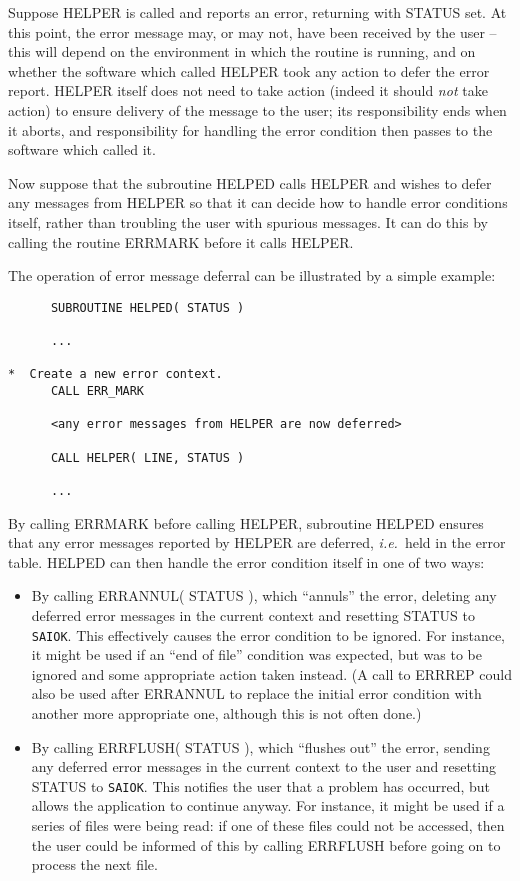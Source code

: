 \documentclass[twoside,11pt]{article}
\renewcommand{\_}{\texttt{\symbol{95}}}
\newcommand{\const}[1]{\texttt{#1}}
\newcommand{\saiok}{\const{SAI\_\_OK}}
\begin{document}
Suppose HELPER is called and reports an error, returning with STATUS set.
At this point, the error message may, or may not, have been received by the
user -- this will depend on the environment in which the routine is running,
and on whether the software which called HELPER took any action to defer the
error report.
HELPER itself does not need to take action (indeed it should \emph{not} take
action) to ensure delivery of the message to the user; its responsibility
ends when it aborts, and responsibility for handling the error condition then
passes to the software which called it.

Now suppose that the subroutine HELPED calls HELPER and wishes to defer any
messages from HELPER so that it can decide how to handle error conditions
itself, rather than troubling the user with spurious messages.
It can do this by calling the routine ERR\_MARK before it calls HELPER.

The operation of error message deferral can be illustrated by a simple
example:

\begin {small}
\begin{verbatim}
      SUBROUTINE HELPED( STATUS )

      ...

*  Create a new error context.
      CALL ERR_MARK

      <any error messages from HELPER are now deferred>

      CALL HELPER( LINE, STATUS )

      ...
\end{verbatim}
\end {small}

By calling ERR\_MARK before calling HELPER, subroutine HELPED ensures that any
error  messages reported by HELPER are deferred, \textit{i.e.}\ held in the error table.
HELPED can then handle the error condition itself in one of two ways:

\begin {itemize}
\item By calling ERR\_ANNUL( STATUS ), which ``annuls'' the error, deleting
any deferred error messages in the current context and resetting STATUS to
\saiok.
This effectively causes the error condition to be ignored.
For instance, it might be used if an ``end of file'' condition was expected,
but was to be ignored and some appropriate action taken instead.
(A call to ERR\_REP could also be used after ERR\_ANNUL to replace the
initial error condition with another more appropriate one, although this is
not often done.)

\item By calling ERR\_FLUSH( STATUS ), which ``flushes out'' the error,
sending any deferred error messages in the current context to the user and
resetting STATUS to \saiok.
This notifies the user that a problem has occurred, but allows the
application to continue anyway.
For instance, it might be used if a series of files were being read: if one
of these files could not be accessed, then the user could be informed of
this by calling ERR\_FLUSH before going on to process the next file.
\end{itemize}
\end{document}
